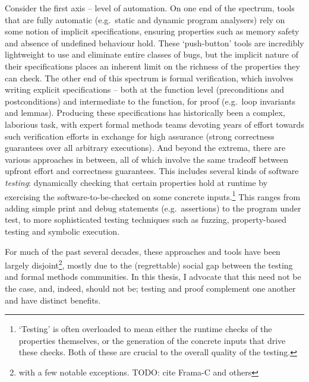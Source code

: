 \documentclass[withindex,glossary]{cam-thesis}
\newcommand\TODO[1]{}
\newcommand\TODO[1]{{\color{violet}TODO: #1}}
\begin{document}
Consider the first axis -- level of automation. On one end of the spectrum, tools that are fully automatic (e.g.~static and dynamic program analysers) rely on some notion of implicit specifications, ensuring properties such as memory safety and absence of undefined behaviour hold. These `push-button' tools are incredibly lightweight to use and eliminate entire classes of bugs, but the implicit nature of their specifications places an inherent limit on the richness of the properties they can check. The other end of this spectrum is formal verification, which involves writing explicit specifications -- both at the function level (preconditions and postconditions) and intermediate to the function, for proof (e.g.~loop invariants and lemmas). Producing these specifications has historically been a complex, laborious task, with expert formal methods teams devoting years of effort towards such verification efforts in exchange for high assurance (strong correctness guarantees over all arbitrary executions). And beyond the extrema, there are various approaches in between, all of which involve the same tradeoff between upfront\TODO{I am trying to be careful in not using the word manual, in the age of AI} effort and correctness guarantees. This includes several kinds of software \emph{testing}: dynamically checking that certain properties hold at runtime by exercising the software-to-be-checked on some concrete inputs.\footnote{`Testing' is often overloaded to mean either the runtime checks of the properties themselves, or the generation of the concrete inputs that drive these checks. Both of these are crucial to the overall quality of the testing.} This ranges from adding simple print and debug statements (e.g.~assertions) to the program under test, to more sophisticated testing techniques such as fuzzing, property-based testing and symbolic execution.\TODO{Talk about AI? :/}

For much of the past several decades, these approaches and tools have been largely disjoint\footnote{with a few notable exceptions. TODO: cite Frama-C and others}, mostly due to the (regrettable) social gap between the testing and formal methods communities. In this thesis, I advocate that this need not be the case, and, indeed, should not be; testing and proof complement one another and have distinct benefits.

\end{document}
